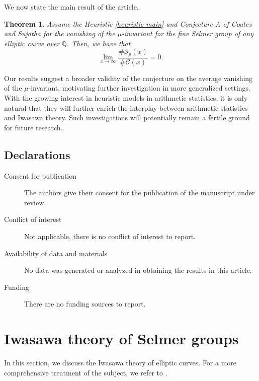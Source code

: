 \documentclass[12pt]{amsart}
\newtheorem{lthm}{Theorem}
\newcommand{\Q}{\mathbb{Q}}
\numberwithin{equation}{section}
\begin{document}
We now state the main result of the article.
\begin{lthm}\label{thm A}
    Assume the Heuristic \ref{heuristic main} and Conjecture A of Coates and Sujatha \cite{CoatesSujathaMathAnnalen} for the vanishing of the $\mu$-invariant for the fine Selmer group of any elliptic curve over $\Q$. Then, we have that 
    \[\lim_{x\rightarrow\infty} \frac{\# \mathcal{S}_p(x)}{\# \mathcal{C}(x)}=0.\]
\end{lthm}
 
\par Our results suggest a broader validity of the conjecture on the average vanishing of the $\mu$-invariant, motivating further investigation in more generalized settings. With the growing interest in heuristic models in arithmetic statistics, it is only natural that they will further enrich the interplay between arithmetic statistics and Iwasawa theory. Such  investigations will potentially remain a fertile ground for future research.
\subsection*{Declarations}
\begin{description}
    \item[Consent for publication] The authors give their consent for the publication of the manuscript under review.
     \item[Conflict of interest] Not applicable, there is no conflict of interest to report.
    \item[Availability of data and materials] No data was generated or analyzed in obtaining the results in this article.
    \item[Funding] There are no funding sources to report.
\end{description}


\section{Iwasawa theory of Selmer groups}
\par In this section, we discuss the Iwasawa theory of elliptic curves. For a more comprehensive treatment of the subject, we refer to \cite{CoatesSujathaGCEC,GreenbergIwasawath}.
\end{document}
